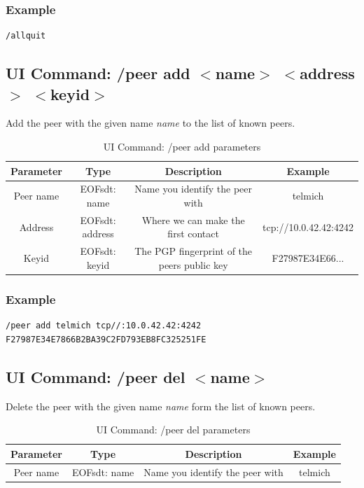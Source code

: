 \subsubsection{Example}
\begin{verbatim}
/allquit
\end{verbatim}
\subsection{UI Command: /peer add $<$name$>$ $<$address$>$ $<$keyid$>$}
Add the peer with the given name \textit{name} to the list of known peers.

%
\begin{longtable}{|c|c|c|c|}
\caption{UI Command: /peer add parameters}\\
\hline
\textbf{Parameter} & \textbf{Type} & \textbf{Description} & \textbf{Example}\\
\hline
Peer name & EOFsdt: name & Name you identify the peer with & telmich\\
\hline
Address & EOFsdt: address & Where we can make the first contact & tcp://10.0.42.42:4242\\
\hline
Keyid & EOFsdt: keyid & The PGP fingerprint of the peers public key & F27987E34E66...\\
\hline
\end{longtable}

\subsubsection{Example}
\begin{verbatim}
/peer add telmich tcp//:10.0.42.42:4242 F27987E34E7866B2BA39C2FD793EB8FC325251FE
\end{verbatim}
\subsection{UI Command: /peer del $<$name$>$}
Delete the peer with the given name \textit{name} form the list of known peers.

%
\begin{longtable}{|c|c|c|c|}
\caption{UI Command: /peer del parameters}\\
\hline
\textbf{Parameter} & \textbf{Type} & \textbf{Description} & \textbf{Example}\\
\hline
Peer name & EOFsdt: name & Name you identify the peer with & telmich\\
\hline
\end{longtable}

